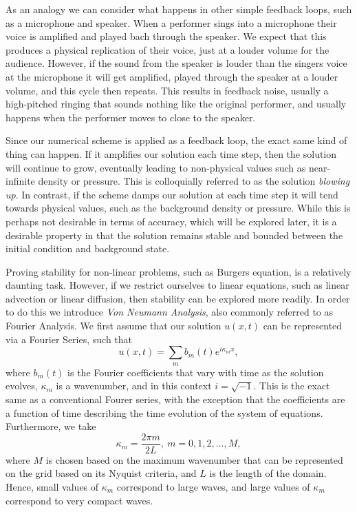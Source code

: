 As an analogy we can consider what happens in other simple feedback loops, such as a microphone and speaker. When a performer sings into a microphone their voice is amplified and played bach through the speaker. We expect that this produces a physical replication of their voice, just at a louder volume for the audience. However, if the sound from the speaker is louder than the singers voice at the microphone it will get amplified, played through the speaker at a louder volume, and this cycle then repeats. This results in feedback noise, usually a high-pitched ringing that sounds nothing like the original performer, and usually happens when the performer moves to close to the speaker.

Since our numerical scheme is applied as a feedback loop, the exact same kind of thing can happen. If it amplifies our solution each time step, then the solution will continue to grow, eventually leading to non-physical values such as near-infinite density or pressure. This is colloquially referred to as the solution {\it blowing up}. In contrast, if the scheme damps our solution at each time step it will tend towards physical values, such as the background density or pressure. While this is perhaps not desirable in terms of accuracy, which will be explored later, it is a desirable property in that the solution remains stable and bounded between the initial condition and background state.

Proving stability for non-linear problems, such as Burgers equation, is a relatively daunting task. However, if we restrict ourselves to linear equations, such as linear advection or linear diffusion, then stability can be explored more readily. In order to do this we introduce {\it Von Neumann Analysis}, also commonly referred to as Fourier Analysis. We first assume that our solution $u(x,t)$ can be represented via a Fourier Series, such that
\begin{equation}
	u(x,t) = \sum_{m} b_m(t) e^{i \kappa_m x},
\end{equation}
where $b_m(t)$ is the Fourier coefficients that vary with time as the solution evolves, $\kappa_m$ is a wavenumber, and in this context $i = \sqrt{-1}$. This is the exact same as a conventional Fourer series, with the exception that the coefficients are a function of time describing the time evolution of the system of equations. Furthermore, we take
\begin{equation}
	\kappa_m = \frac{2 \pi m}{2 L}, \: m=0,1,2,\hdots,M,
\end{equation}
where $M$ is chosen based on the maximum wavenumber that can be represented on the grid based on its Nyquist criteria, and $L$ is the length of the domain. Hence, small values of $\kappa_m$ correspond to large waves, and large values of $\kappa_m$ correspond to very compact waves.

